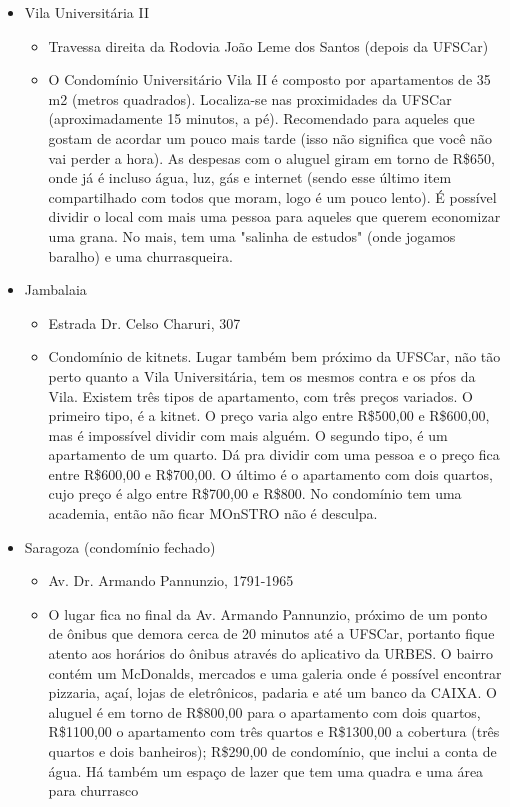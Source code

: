 \begin{itemize}
  \item Vila Universitária II
    \begin{itemize}
      \item Travessa direita da Rodovia João Leme dos Santos (depois da UFSCar)
      \item O Condomínio Universitário Vila II é composto por apartamentos de 35 m2 (metros quadrados). Localiza-se nas proximidades da UFSCar (aproximadamente 15 minutos, a pé). Recomendado para aqueles que gostam de acordar um pouco mais tarde (isso não significa que você não vai perder a hora). As despesas com o aluguel giram em torno de R\$650, onde já é incluso água, luz, gás e internet (sendo esse último item compartilhado com todos que moram, logo é um pouco lento). É possível dividir o
          local com mais uma pessoa para aqueles que querem economizar uma grana. No mais, tem uma "salinha de estudos"  (onde jogamos baralho) e uma churrasqueira.
    \end{itemize}
  \item Jambalaia
    \begin{itemize}
      \item Estrada Dr. Celso Charuri, 307
      \item Condomínio de kitnets. Lugar também bem próximo da UFSCar, não tão perto quanto a Vila Universitária, tem os mesmos contra e os pŕos da Vila. Existem três tipos de apartamento, com três preços variados. O primeiro tipo, é a kitnet. O preço varia algo entre R\$500,00 e R\$600,00, mas é impossível dividir com mais alguém. O segundo tipo, é um apartamento de um quarto. Dá pra dividir com uma pessoa e o preço fica entre R\$600,00 e R\$700,00. O último é o apartamento com dois quartos, cujo preço é algo entre R\$700,00 e R\$800. No condomínio tem uma academia, então não ficar MOnSTRO não é desculpa.
    \end{itemize}
  \item Saragoza (condomínio fechado)
    \begin{itemize}
      \item Av. Dr. Armando Pannunzio, 1791-1965
      \item{O lugar fica no final da Av. Armando Pannunzio, próximo de um ponto de ônibus que demora cerca de 20 minutos até a UFSCar, portanto fique atento aos horários do ônibus através do aplicativo da URBES. O bairro contém um McDonalds, mercados e uma galeria onde é possível encontrar pizzaria, açaí, lojas de eletrônicos, padaria e até um banco da CAIXA.
	      O aluguel é em torno de R\$800,00 para o apartamento com dois quartos, R\$1100,00 o apartamento com três quartos e R\$1300,00 a cobertura (três quartos e dois banheiros); R\$290,00 de condomínio, que inclui a conta de água. Há também um espaço de lazer que tem uma quadra e uma área para churrasco}
    \end{itemize}


\end{itemize}
